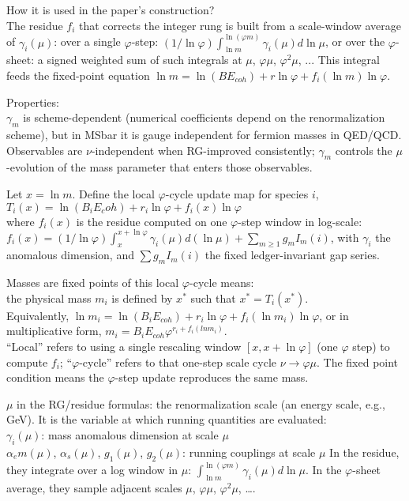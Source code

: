 \documentclass[%
 amsmath,amssymb,
 aps,
prb,
floatfix, showkeys
]{revtex4-2}
\begin{document}
    How it is used in the paper’s construction? \\
    The residue $f_i$ that corrects the integer rung is built from a scale-window average of
    $\gamma_i(\mu)$: over a single $\varphi$-step:
    $(1/\ln \varphi) \int_{\ln m}^{\ln(\varphi m)} \gamma_i(\mu) d \ln \mu$,
    or over the $\varphi$-sheet: a signed weighted sum of such integrals at
    $\mu$, $\varphi \mu$, $\varphi^2 \mu$, ... 
    This integral feeds the fixed-point equation
    $\ln m = \ln(B E_{coh}) + r \ln \varphi + f_i(\ln m) \ln \varphi$.

    Properties: \\
$\gamma_m$ is scheme-dependent (numerical coefficients depend on the renormalization scheme),
but in MSbar it is gauge independent for fermion masses in QED/QCD.
Observables are $\nu$-independent when RG-improved consistently;
$\gamma_m$ controls the $\mu$-evolution of the mass parameter that enters those observables.


\vspace{2.0cm}
Let $x = \ln m$. Define the local $\varphi$-cycle update map for species $i$,\\
$T_i(x) = \ln(B_i E_coh) + r_i \ln \varphi + f_i(x) \ln \varphi$ \\
where $f_i(x)$ is the residue computed on one $\varphi$-step window in log-scale:\\
$f_i(x) = (1/\ln \varphi) \int_{x}^{x+\ln \varphi} \gamma_i(\mu) d( \ln \mu) + \sum_{m \ge 1} g_m I_m(i)$,
with $\gamma_i$ the anomalous dimension, and $\sum g_m I_m(i) $ the fixed ledger-invariant gap series.

Masses are fixed points of this local $\varphi$-cycle means: \\
the physical mass $m_i$ is defined by $x^*$ such that $x^* = T_i(x^*)$.\\
Equivalently, $\ln m_i = \ln(B_i E_{coh}) + r_i \ln \varphi + f_i(\ln m_i) \ln \varphi$,
or in multiplicative form,
$m_i = B_i E_{coh} \varphi^{r_i + f_i(ln m_i)}$.\\

“Local” refers to using a single rescaling window $[x, x+\ln \varphi]$ (one $\varphi$ step)
to compute $f_i$; “$\varphi$-cycle” refers to that one-step scale cycle
$\nu \to \varphi \mu$. The fixed point condition means the $\varphi$-step
update reproduces the same mass.


$\mu$ in the RG/residue formulas: the renormalization scale (an energy scale, e.g., GeV).
It is the variable at which running quantities are evaluated:\\
 $\gamma_i(\mu)$: mass anomalous dimension at scale $\mu$ \\
$\alpha_e m(\mu)$, $\alpha_s(\mu)$, $g_1(\mu)$, $g_2(\mu)$: running couplings at scale $\mu$
 In the residue, they integrate over a log window in $\mu$: $\int_{\ln m}^{\ln(\varphi m)} \gamma_i(\mu) d \ln \mu$.
 In the $\varphi$-sheet average, they sample adjacent scales
 {$\mu$, $\varphi \mu$, $\varphi^2 \mu$, …}.
\end{document}
